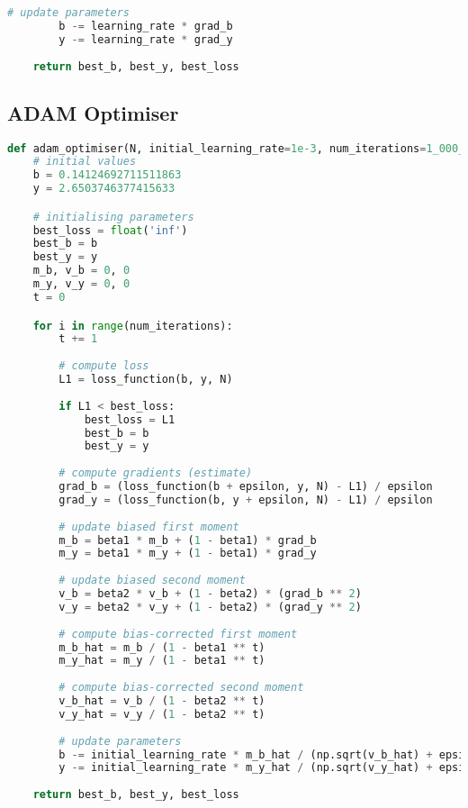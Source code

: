 \begin{appendices}
\begin{lstlisting}[language=Python, caption= Initial gradient descent setup as outlined in Algorithm \ref{algo:gd_l1}]
        # update parameters
        b -= learning_rate * grad_b
        y -= learning_rate * grad_y
    
    return best_b, best_y, best_loss
\end{lstlisting}

\subsection{ADAM Optimiser}
\begin{lstlisting}[language=Python, caption= Implementation of the initial ADAM optimiser run (Algorithm \ref{algo:adam_l1})]
def adam_optimiser(N, initial_learning_rate=1e-3, num_iterations=1_000_000, beta1=0.9, beta2=0.999, epsilon=1e-5):
	# initial values
    b = 0.14124692711511863
    y = 2.6503746377415633

	# initialising parameters
    best_loss = float('inf')
    best_b = b
    best_y = y
    m_b, v_b = 0, 0
    m_y, v_y = 0, 0
    t = 0

    for i in range(num_iterations):
        t += 1
        
        # compute loss
        L1 = loss_function(b, y, N)
        
        if L1 < best_loss:
            best_loss = L1
            best_b = b
            best_y = y
        
        # compute gradients (estimate)
        grad_b = (loss_function(b + epsilon, y, N) - L1) / epsilon
        grad_y = (loss_function(b, y + epsilon, N) - L1) / epsilon
        
        # update biased first moment
        m_b = beta1 * m_b + (1 - beta1) * grad_b
        m_y = beta1 * m_y + (1 - beta1) * grad_y
        
        # update biased second moment
        v_b = beta2 * v_b + (1 - beta2) * (grad_b ** 2)
        v_y = beta2 * v_y + (1 - beta2) * (grad_y ** 2)
        
        # compute bias-corrected first moment
        m_b_hat = m_b / (1 - beta1 ** t)
        m_y_hat = m_y / (1 - beta1 ** t)
        
        # compute bias-corrected second moment
        v_b_hat = v_b / (1 - beta2 ** t)
        v_y_hat = v_y / (1 - beta2 ** t)
        
        # update parameters
        b -= initial_learning_rate * m_b_hat / (np.sqrt(v_b_hat) + epsilon)
        y -= initial_learning_rate * m_y_hat / (np.sqrt(v_y_hat) + epsilon)
       
    return best_b, best_y, best_loss
\end{lstlisting}

  
\end{appendices}